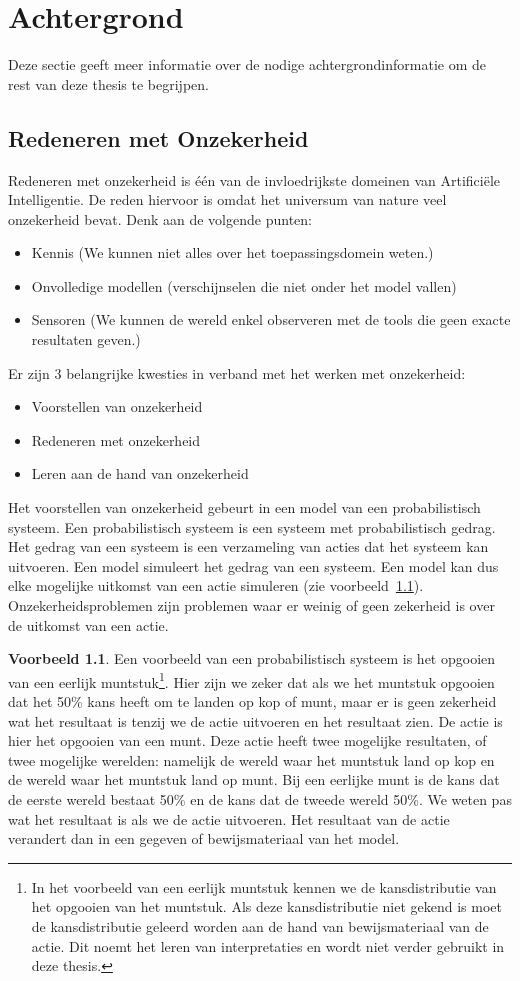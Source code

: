 \documentclass[12pt,a4paper,oneside]{book}
\theoremstyle{definition}
\newtheorem{exmp}{Voorbeeld}[section]
\begin{document}
\chapter{Achtergrond}
Deze sectie geeft meer informatie over de nodige achtergrondinformatie om de rest van deze thesis te begrijpen.
\section{Redeneren met Onzekerheid}
Redeneren met onzekerheid is \'{e}\'{e}n van de invloedrijkste domeinen van Artifici\"{e}le Intelligentie. De reden hiervoor is omdat het universum van nature veel onzekerheid bevat. Denk aan de volgende punten:
\begin{itemize}
	\item Kennis (We kunnen niet alles over het toepassingsdomein weten.)
	\item Onvolledige modellen (verschijnselen die niet onder het model vallen)
	\item Sensoren (We kunnen de wereld enkel observeren met de tools die geen exacte resultaten geven.)
\end{itemize}
Er zijn 3 belangrijke kwesties in verband met het werken met onzekerheid:
\begin{itemize}
	\item Voorstellen van onzekerheid
	\item Redeneren met onzekerheid
	\item Leren aan de hand van onzekerheid
\end{itemize}
Het voorstellen van onzekerheid gebeurt in een model van een probabilistisch systeem. Een probabilistisch systeem is een systeem met probabilistisch gedrag. Het gedrag van een systeem is een verzameling van acties dat het systeem kan uitvoeren. Een model simuleert het gedrag van een systeem. Een model kan dus elke mogelijke uitkomst van een actie simuleren (zie voorbeeld~\ref{exmp:faircoin}). Onzekerheidsproblemen zijn problemen waar er weinig of geen zekerheid is over de uitkomst van een actie.
\begin{exmp}
\label{exmp:faircoin}
Een voorbeeld van een probabilistisch systeem is het opgooien van een eerlijk muntstuk\footnote{In het voorbeeld van een eerlijk muntstuk kennen we de kansdistributie van het opgooien van het muntstuk. Als deze kansdistributie niet gekend is moet de kansdistributie geleerd worden aan de hand van  bewijsmateriaal van de actie. Dit noemt het leren van interpretaties en wordt niet verder gebruikt in deze thesis.}. Hier zijn we zeker dat als we het muntstuk opgooien dat het 50\% kans heeft om te landen op kop of munt, maar er is geen zekerheid wat het resultaat is tenzij we de actie uitvoeren en het resultaat zien. De actie is hier het opgooien van een munt. Deze actie heeft twee mogelijke resultaten, of twee mogelijke werelden: namelijk de wereld waar het muntstuk land op kop en de wereld waar het muntstuk land op munt. Bij een eerlijke munt is de kans dat de eerste wereld bestaat 50\% en de kans dat de tweede wereld 50\%. We weten pas wat het resultaat is als we de actie uitvoeren. Het resultaat van de actie verandert dan in een gegeven of bewijsmateriaal van het model.
\end{exmp}
\end{document}
